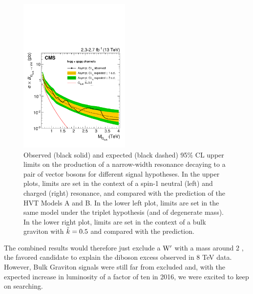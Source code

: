 \begin{figure}[!h]
\includegraphics[width=0.49\textwidth]{figures/analysis/search1/B2G-16-004//EXOVVbulkg_ALL13_UL_Asymptotic_log.pdf}
\caption{Observed (black solid) and expected (black dashed) 95\% CL upper limits on the production of a narrow-width resonance decaying to 
a pair of vector bosons for different signal hypotheses. In the upper plots, limits are set in the context of a spin-1 neutral \PZpr (left) and charged \PWpr (right) resonance, and compared with the prediction of the HVT Models A and B. In the lower left plot, limits are set in the same model under the triplet hypothesis (\PWpr and \PZpr of degenerate mass). In the lower right plot, limits are set in the context of a bulk graviton with $\tilde{k} =0.5$ and compared with the prediction.
}
\label{fig:searchI:limitCombined}
\end{figure}
The combined results would therefore just exclude a $\mathrm{W}^\prime$ with a mass around 2 \TeV, the favored candidate to explain the diboson excess observed in 8 TeV data.
However, Bulk Graviton signals were still far from excluded and, with the expected increase in luminosity of a factor of ten in 2016, we were excited to keep on searching.


